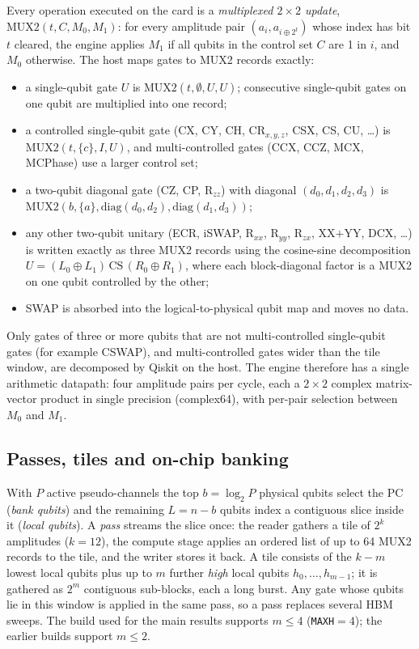 Every operation executed on the card is a \emph{multiplexed $2\times2$ update}, $\mathrm{MUX2}(t, C, M_0, M_1)$: for every amplitude pair $(a_{i}, a_{i\oplus 2^t})$ whose index has bit $t$ cleared, the engine applies $M_1$ if all qubits in the control set $C$ are 1 in $i$, and $M_0$ otherwise. The host maps gates to MUX2 records exactly:
\begin{itemize}
\item a single-qubit gate $U$ is $\mathrm{MUX2}(t,\emptyset,U,U)$; consecutive single-qubit gates on one qubit are multiplied into one record;
\item a controlled single-qubit gate (CX, CY, CH, CR$_{x,y,z}$, CSX, CS, CU, \ldots) is $\mathrm{MUX2}(t,\{c\},I,U)$, and multi-controlled gates (CCX, CCZ, MCX, MCPhase) use a larger control set;
\item a two-qubit diagonal gate (CZ, CP, R$_{zz}$) with diagonal $(d_0,d_1,d_2,d_3)$ is $\mathrm{MUX2}(b,\{a\},\mathrm{diag}(d_0,d_2),\mathrm{diag}(d_1,d_3))$;
\item any other two-qubit unitary (ECR, iSWAP, R$_{xx}$, R$_{yy}$, R$_{zx}$, XX$+$YY, DCX, \ldots) is written exactly as three MUX2 records using the cosine-sine decomposition $U=(L_0\oplus L_1)\,\mathrm{CS}\,(R_0\oplus R_1)$, where each block-diagonal factor is a MUX2 on one qubit controlled by the other;
\item SWAP is absorbed into the logical-to-physical qubit map and moves no data.
\end{itemize}
Only gates of three or more qubits that are not multi-controlled single-qubit gates (for example CSWAP), and multi-controlled gates wider than the tile window, are decomposed by Qiskit on the host. The engine therefore has a single arithmetic datapath: four amplitude pairs per cycle, each a $2\times2$ complex matrix-vector product in single precision (complex64), with per-pair selection between $M_0$ and $M_1$.

\subsection{Passes, tiles and on-chip banking}\label{subsec:tiles}

With $P$ active pseudo-channels the top $b=\log_2 P$ physical qubits select the PC (\emph{bank qubits}) and the remaining $L=n-b$ qubits index a contiguous slice inside it (\emph{local qubits}). A \emph{pass} streams the slice once: the reader gathers a tile of $2^{k}$ amplitudes ($k=12$), the compute stage applies an ordered list of up to 64 MUX2 records to the tile, and the writer stores it back. A tile consists of the $k-m$ lowest local qubits plus up to $m$ further \emph{high} local qubits $h_0,\ldots,h_{m-1}$; it is gathered as $2^m$ contiguous sub-blocks, each a long burst. Any gate whose qubits lie in this window is applied in the same pass, so a pass replaces several HBM sweeps. The build used for the main results supports $m\leq 4$ (\texttt{MAXH}$=4$); the earlier builds support $m\leq 2$.


